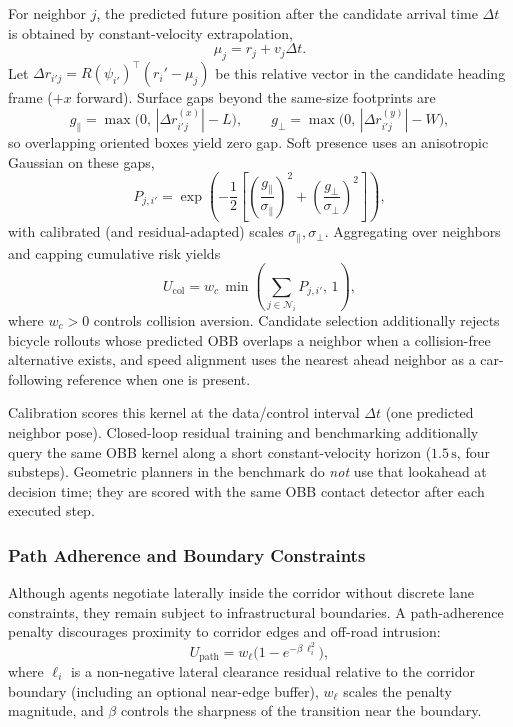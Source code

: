 \documentclass[conference]{IEEEtran}
\begin{document}
For neighbor $j$, the predicted future position after the candidate arrival time $\Delta t$ is obtained by constant-velocity extrapolation,
\begin{equation}
\mu_{j}
=
r_{j}+v_{j}\Delta t.
\end{equation}
Let $\Delta r_{i'j}=R(\psi_{i'})^{\top}(r_{i}'-\mu_{j})$ be this relative vector in the candidate heading frame ($+x$ forward). Surface gaps beyond the same-size footprints are
\begin{equation}
g_{\parallel}=\max\!\bigl(0,\,|\Delta r_{i'j}^{(x)}|-L\bigr),\qquad
g_{\perp}=\max\!\bigl(0,\,|\Delta r_{i'j}^{(y)}|-W\bigr),
\end{equation}
so overlapping oriented boxes yield zero gap. Soft presence uses an anisotropic Gaussian on these gaps,
\begin{equation}
P_{j,i'}
=
\exp\!\left(
-\frac{1}{2}
\left[
\left(\frac{g_{\parallel}}{\sigma_{\parallel}}\right)^{2}
+
\left(\frac{g_{\perp}}{\sigma_{\perp}}\right)^{2}
\right]
\right),
\end{equation}
with calibrated (and residual-adapted) scales $\sigma_{\parallel},\sigma_{\perp}$. Aggregating over neighbors and capping cumulative risk yields
\begin{equation}
U_{\mathrm{col}}
=
w_{c}\,
\min\!\left(
\sum_{j\in\mathcal{N}_{i}}
P_{j,i'}
,\,1
\right),
\end{equation}
where $w_{c}>0$ controls collision aversion. Candidate selection additionally rejects bicycle rollouts whose predicted OBB overlaps a neighbor when a collision-free alternative exists, and speed alignment uses the nearest ahead neighbor as a car-following reference when one is present.

Calibration scores this kernel at the data/control interval $\Delta t$ (one predicted neighbor pose). Closed-loop residual training and benchmarking additionally query the same OBB kernel along a short constant-velocity horizon ($1.5\,\mathrm{s}$, four substeps). Geometric planners in the benchmark do \emph{not} use that lookahead at decision time; they are scored with the same OBB contact detector after each executed step.

\subsubsection{Path Adherence and Boundary Constraints}
Although agents negotiate laterally inside the corridor without discrete lane constraints, they remain subject to infrastructural boundaries. A path-adherence penalty discourages proximity to corridor edges and off-road intrusion:
\begin{equation}
U_{\mathrm{path}}
=
w_{\ell}\big(1-e^{-\beta\,\ell_{i}^{2}}\big),
\end{equation}
where $\ell_{i}$ is a non-negative lateral clearance residual relative to the corridor boundary (including an optional near-edge buffer), $w_{\ell}$ scales the penalty magnitude, and $\beta$ controls the sharpness of the transition near the boundary.
\end{document}
